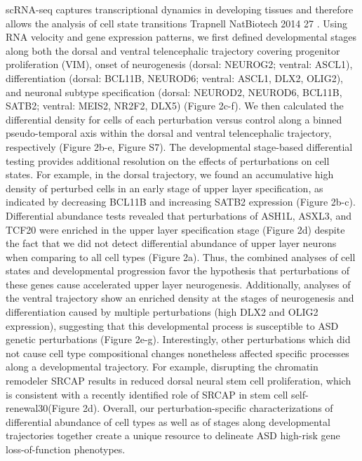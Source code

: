scRNA-seq captures transcriptional dynamics in developing tissues and therefore allows the analysis of cell state transitions {Trapnell NatBiotech 2014} 27 . Using RNA velocity and gene expression patterns, we first defined developmental stages along both the dorsal and ventral telencephalic trajectory covering progenitor proliferation (VIM), onset of neurogenesis (dorsal: NEUROG2; ventral: ASCL1), differentiation (dorsal: BCL11B, NEUROD6; ventral: ASCL1, DLX2, OLIG2), and neuronal subtype specification (dorsal: NEUROD2, NEUROD6, BCL11B, SATB2; ventral: MEIS2, NR2F2, DLX5) (Figure 2c-f). We then calculated the differential density for cells of each perturbation versus control along a binned pseudo-temporal axis within the dorsal and ventral telencephalic trajectory, respectively (Figure 2b-e, Figure S7). 
The developmental stage-based differential testing provides additional resolution on the effects of perturbations on cell states. For example, in the dorsal trajectory, we found an accumulative high density of perturbed cells in an early stage of upper layer specification, as indicated by decreasing BCL11B and increasing SATB2 expression (Figure 2b-c). Differential abundance tests revealed that perturbations of ASH1L, ASXL3, and TCF20 were enriched in the upper layer specification stage (Figure 2d) despite the fact that we did not detect differential abundance of upper layer neurons when comparing to all cell types (Figure 2a). Thus, the combined analyses of cell states and developmental progression favor the hypothesis that perturbations of these genes cause accelerated upper layer neurogenesis. Additionally, analyses of the ventral trajectory show an enriched density at the stages of neurogenesis and differentiation caused by multiple perturbations (high DLX2 and OLIG2 expression), suggesting that this developmental process is susceptible to ASD genetic perturbations (Figure 2e-g). Interestingly, other perturbations which did not cause cell type compositional changes nonetheless affected specific processes along a developmental trajectory. For example, disrupting the chromatin remodeler SRCAP results in reduced dorsal neural stem cell proliferation, which is consistent with a recently identified role of SRCAP in stem cell self-renewal30(Figure 2d). 
Overall, our perturbation-specific characterizations of differential abundance of cell types as well as of stages along developmental trajectories together create a unique resource to delineate ASD high-risk gene loss-of-function phenotypes.

